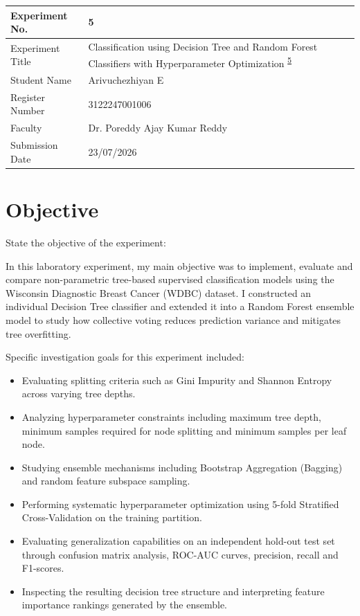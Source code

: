 \documentclass[12pt,a4paper]{article}
\begin{document}

\begin{tabular}{|p{4cm}|p{11cm}|}
\hline
Experiment No. & 5 \\ \hline
Experiment Title & Classification using Decision Tree and Random Forest Classifiers with Hyperparameter Optimization \textsuperscript{\href{https://github.com/arivuchezhiyan/Machine_Learning/tree/main/experiment_5}{5}} \\ \hline
Student Name & Arivuchezhiyan E \\ \hline
Register Number & 3122247001006 \\ \hline
Faculty & Dr. Poreddy Ajay Kumar Reddy \\ \hline
Submission Date & 23/07/2026 \\ \hline
\end{tabular}

\vspace{0.5cm}

\section{Objective}
State the objective of the experiment:

In this laboratory experiment, my main objective was to implement, evaluate and compare non-parametric tree-based supervised classification models using the Wisconsin Diagnostic Breast Cancer (WDBC) dataset. I constructed an individual Decision Tree classifier and extended it into a Random Forest ensemble model to study how collective voting reduces prediction variance and mitigates tree overfitting.

Specific investigation goals for this experiment included:
\begin{itemize}
\item Evaluating splitting criteria such as Gini Impurity and Shannon Entropy across varying tree depths.
\item Analyzing hyperparameter constraints including maximum tree depth, minimum samples required for node splitting and minimum samples per leaf node.
\item Studying ensemble mechanisms including Bootstrap Aggregation (Bagging) and random feature subspace sampling.
\item Performing systematic hyperparameter optimization using 5-fold Stratified Cross-Validation on the training partition.
\item Evaluating generalization capabilities on an independent hold-out test set through confusion matrix analysis, ROC-AUC curves, precision, recall and F1-scores.
\item Inspecting the resulting decision tree structure and interpreting feature importance rankings generated by the ensemble.
\end{itemize}
\end{document}
